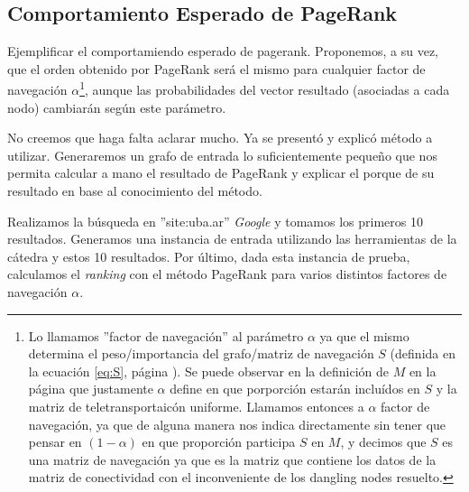 \subsection{Comportamiento Esperado de PageRank}
\label{subsec:exp1}
\begin{LaTeXdescription}
    \item[Objetivo] Ejemplificar el comportamiendo esperado de pagerank.
        Proponemos, a su vez, que el orden obtenido por PageRank ser\'a el mismo
        para cualquier factor de navegaci\'on $\alpha$\footnote{Lo llamamos
        ''factor de navegaci\'on'' al par\'ametro $\alpha$ ya que el mismo
        determina el peso/importancia del grafo/matriz de navegaci\'on $S$
        (definida en la ecuaci\'on \ref{eq:S}, p\'agina \pageref{eq:S}). Se
        puede observar en la definici\'on de $M$ en la p\'agina
        \pageref{eq:M_def} que justamente $\alpha$ define en que porporci\'on
        estar\'an inclu\'idos en $S$ y la matriz de teletransportaic\'on
        uniforme. Llamamos entonces a $\alpha$ factor de navegaci\'on, ya
        que de alguna manera nos indica directamente sin tener que pensar en
        $(1-\alpha)$ en que proporci\'on participa $S$ en $M$, y decimos que
        $S$ es una matriz de navegaci\'on ya que es la matriz que contiene
        los datos de la matriz de conectividad con el inconveniente de los
        dangling nodes resuelto.}, aunque las probabilidades del vector
        resultado (asociadas a cada nodo) cambiar\'an seg\'un este par\'ametro.

    \item[Proposici\'on] No creemos que haga falta aclarar mucho. Ya se present\'o y explic\'o
        m\'etodo a utilizar. Generaremos un grafo de entrada lo suficientemente
        peque\~no que nos permita calcular a mano el resultado de PageRank y
        explicar el porque de su resultado en base al conocimiento del m\'etodo.

    \item[M\'etodo de Experimentaci\'on] Realizamos la b\'usqueda en
        ''site:uba.ar'' \emph{Google}\cite{google} y tomamos los primeros 10
        resultados.  Generamos una instancia de entrada utilizando las
        herramientas de la c\'atedra y estos 10 resultados. Por \'ultimo, dada
        esta instancia de prueba, calculamos el \emph{ranking} con el m\'etodo
        PageRank para varios distintos factores de navegaci\'on $\alpha$.

    \item[Resultados, an\'alisis y discusi\'on]
\end{LaTeXdescription}

